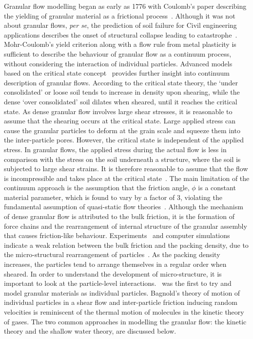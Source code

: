 Granular flow modelling began as early as 1776 with Coulomb's paper describing 
the yielding of granular material as a frictional process~\citep{Coulomb1776}. 
Although it was not about granular flows, \textit{per se}, the prediction of 
soil failure for Civil engineering applications describes the onset of 
structural collapse leading to catastrophe~\citep{Campbell2006}. Mohr-Coulomb's 
yield criterion along with a flow rule from metal plasticity is sufficient to 
describe the behaviour of granular flow as a continuum process, without 
considering the interaction of individual particles. Advanced models based on 
the critical state concept~\citep{Schofield1968} provides further insight into 
continuum description of granular flows. According to the critical state 
theory, the `under consolidated' or loose soil tends to increase in density 
upon shearing, while the dense `over consolidated' soil dilates when sheared, 
until it reaches the critical state. As dense granular flow involves large 
shear stresses, it is reasonable to assume that the shearing occurs at the 
critical state. Large applied stress can cause the granular particles to deform 
at the grain scale and squeeze them into the inter-particle pores. However, the 
critical state is independent of the applied stress. In granular flows, the 
applied stress during the actual flow is less in comparison with the stress on 
the soil underneath a structure, where the soil is subjected to large shear 
strains. It is therefore reasonable to assume that the flow is incompressible 
and takes place at the critical state~\citep{Campbell2006}. The main limitation 
of the continuum approach is the assumption that the friction angle, $\phi$ is 
a constant material parameter, which is found to vary by a factor of 3, 
violating the fundamental assumption of quasi-static flow 
theories~\citep{Potapov1996}. Although the mechanism of dense granular flow is 
attributed to the bulk friction, it is the formation of force chains and the 
rearrangement of internal structure of the granular assembly that causes 
friction-like behaviour. Experiments~\citep{Savage1984,Savage1984a} and 
computer simulations~\citep{Campbell1985} indicate a weak relation between the 
bulk friction and the packing density, due to the micro-structural 
rearrangement of particles~\citep{Campbell1986}. As the packing density 
increases, the particles tend to arrange themselves in a regular order when 
sheared. In order to understand the development of micro-structure, it is 
important to look at the particle-level interactions.~\citet{Bagnold1954} was 
the first to try and model granular materials as individual particles. 
Bagnold's theory of motion of individual particles in a shear flow and 
inter-particle friction inducing random velocities is reminiscent of the 
thermal motion of molecules in the kinetic theory of gases. The two common 
approaches in modelling the granular flow: the kinetic theory and the shallow 
water theory, are discussed below.

